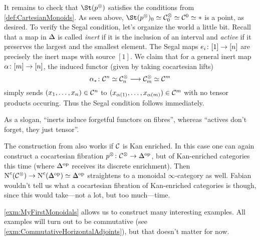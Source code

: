 \begin{exm}
\begin{alphanumerate}
		It remains to check that $\St (p^\otimes)$ satisfies the conditions from \cref{def:CartesianMonoids}. As seen above, $\St (p^\otimes)_0\simeq \Cc_0^\otimes \simeq \Cc^0\simeq *$ is a point, as desired. To verify the Segal condition, let's organize the world a little bit. Recall that a map in $\IDelta$ is called \emph{inert} if it is the inclusion of an interval and \emph{active} if it preserves the largest and the smallest element. The Segal maps $e_i\colon [1]\morphism {}[n]$ are precisely the inert maps with source $[1]$. We claim that for a general inert map $\alpha\colon [m]\morphism{[n]}$, the induced functor (given by taking cocartesian lifts) 
		\begin{equation*}
			\alpha_*\colon \Cc^n\simeq \Cc_n^\otimes \morphism \Cc_m^\otimes \simeq \Cc^m
		\end{equation*}
		simply sends $(x_1,\dotsc,x_n)\in \mathcal{C}^n$ to $(x_{\alpha(1)},\dotsc,x_{\alpha(m)})\in \mathcal{C}^m$ with no tensor products occuring. Thus the Segal condition follows immediately.
		
		As a slogan, \enquote{inerts induce forgetful functors on fibres}, whereas \enquote{actives don't forget, they just tensor}. %
		\item The construction from  also works if $\mathcal{C}$ is Kan enriched. In this case one can again construct a cocartesian fibration $p^\otimes\colon \Cc^\otimes \morphism \IDelta^\op$, but of Kan-enriched categories this time (where $\IDelta^\op$ receives its discrete enrichment). Then $\N^c(\Cc^\otimes)\morphism \N^c(\IDelta^\op)\simeq \IDelta^\op$ straightens to a monoidal $\infty$-category as well. Fabian wouldn't tell us what a cocartesian fibration of Kan-enriched categories is though, since this would take---not a lot, but too much---time.
	\end{alphanumerate}
\end{exm}
\cref{exm:MyFirstMonoidals} allows us to construct many interesting examples. All examples will turn out to be commutative (see \cref{exm:CommutativeHorizontalAdjoints}), but that doesn't matter for now.

